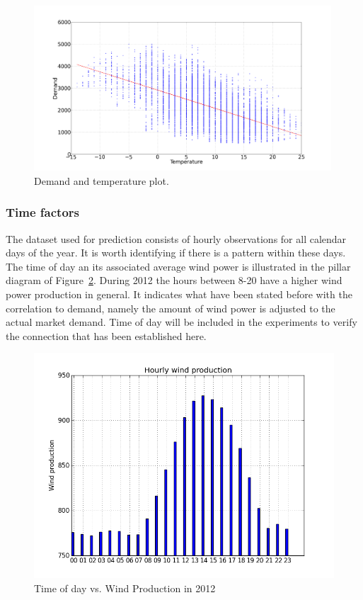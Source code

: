 \begin{figure}[h!]
\centering
\includegraphics[width=0.99\textwidth]{billeder/energy_price_plots/consump_temp.png}
\caption{Demand and temperature plot.}
\label{fig:consump_temp_green}
\end{figure}

\subsubsection{Time factors}
\label{sec:windProdSeasonality}
The dataset used for prediction consists of hourly observations for all calendar days of the year. It is worth identifying if there is a pattern within these days. The time of day an its associated average wind power is illustrated in the pillar diagram of Figure~\ref{fig:hourly_wind_production}. During 2012 the hours between 8-20 have a higher wind power production in general. It indicates what have been stated before with the correlation to demand, namely the amount of wind power is adjusted to the actual market demand. Time of day will be included in the experiments to verify the connection that has been established here. 

\begin{figure}[ht!]
\centering
\includegraphics[width=0.8\linewidth]{billeder/hourly_wind_production.png}
\caption{Time of day vs. Wind Production in 2012}
\label{fig:hourly_wind_production}
\end{figure}

